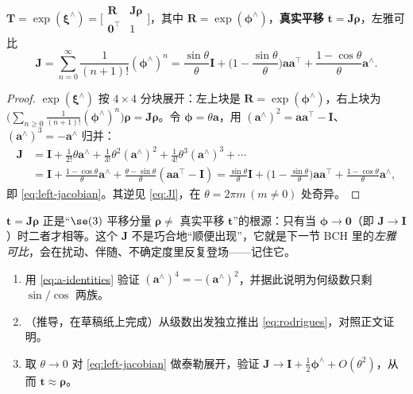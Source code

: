 \begin{theorem}[$\SE(3)$ 指数映射]\label{thm:se3-exp}
$\mathbf{T}=\exp(\boldsymbol{\xi}^\wedge)=\big[\begin{smallmatrix}\mathbf{R}&\mathbf{J}\boldsymbol{\rho}\\\mathbf{0}^\top&1\end{smallmatrix}\big]$，其中 $\mathbf{R}=\exp(\boldsymbol{\phi}^\wedge)$，\textbf{真实平移} $\mathbf{t}=\mathbf{J}\boldsymbol{\rho}$，左雅可比
\begin{equation}
  \mathbf{J}=\sum_{n=0}^{\infty}\frac{1}{(n+1)!}(\boldsymbol{\phi}^\wedge)^n
  =\frac{\sin\theta}{\theta}\mathbf{I}+\Big(1-\frac{\sin\theta}{\theta}\Big)\mathbf{a}\mathbf{a}^\top+\frac{1-\cos\theta}{\theta}\mathbf{a}^\wedge.
  \label{eq:left-jacobian}
\end{equation}
\end{theorem}
\begin{proof}
$\exp(\boldsymbol{\xi}^\wedge)$ 按 $4\times4$ 分块展开：左上块是 $\mathbf{R}=\exp(\boldsymbol{\phi}^\wedge)$，右上块为 $\big(\sum_{n\ge0}\tfrac{1}{(n+1)!}(\boldsymbol{\phi}^\wedge)^n\big)\boldsymbol{\rho}=\mathbf{J}\boldsymbol{\rho}$。令 $\boldsymbol{\phi}=\theta\mathbf{a}$，用 $(\mathbf{a}^\wedge)^2=\mathbf{a}\mathbf{a}^\top-\mathbf{I}$、$(\mathbf{a}^\wedge)^3=-\mathbf{a}^\wedge$ 归并：
\begin{align*}
  \mathbf{J}&=\mathbf{I}+\tfrac{1}{2!}\theta\mathbf{a}^\wedge+\tfrac{1}{3!}\theta^2(\mathbf{a}^\wedge)^2+\tfrac{1}{4!}\theta^3(\mathbf{a}^\wedge)^3+\cdots\\
  &=\mathbf{I}+\frac{1-\cos\theta}{\theta}\mathbf{a}^\wedge+\frac{\theta-\sin\theta}{\theta}(\mathbf{a}\mathbf{a}^\top-\mathbf{I})
   =\frac{\sin\theta}{\theta}\mathbf{I}+\Big(1-\frac{\sin\theta}{\theta}\Big)\mathbf{a}\mathbf{a}^\top+\frac{1-\cos\theta}{\theta}\mathbf{a}^\wedge,
\end{align*}
即 \cref{eq:left-jacobian}。其逆见 \cref{eq:Jl}，在 $\theta=2\pi m\,(m\neq0)$ 处奇异。
\end{proof}

\begin{insight}
$\mathbf{t}=\mathbf{J}\boldsymbol{\rho}$ 正是“$\se(3)$ 平移分量 $\boldsymbol{\rho}\neq$ 真实平移 $\mathbf{t}$”的根源：只有当 $\boldsymbol{\phi}\to\mathbf{0}$（即 $\mathbf{J}\to\mathbf{I}$）时二者才相等。这个 $\mathbf{J}$ 不是巧合地“顺便出现”，它就是下一节 BCH 里的\emph{左雅可比}，会在扰动、伴随、不确定度里反复登场——记住它。
\end{insight}

\begin{practice}
\begin{enumerate}
  \item 用 \cref{eq:a-identities} 验证 $(\mathbf{a}^\wedge)^4=-(\mathbf{a}^\wedge)^2$，并据此说明为何级数只剩 $\sin/\cos$ 两族。
  \item （推导，在草稿纸上完成）从级数出发独立推出 \cref{eq:rodrigues}，对照正文证明。
  \item 取 $\theta\to0$ 对 \cref{eq:left-jacobian} 做泰勒展开，验证 $\mathbf{J}\to\mathbf{I}+\tfrac12\boldsymbol{\phi}^\wedge+O(\theta^2)$，从而 $\mathbf{t}\approx\boldsymbol{\rho}$。
\end{enumerate}
\end{practice}

